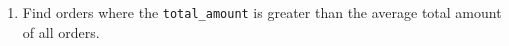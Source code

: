 \documentclass[12pt,a4paper]{article}
\begin{document}
\begin{enumerate}


    \item Find orders where the \texttt{total\_amount} is greater than the average total amount of all orders.







\end{enumerate}
\end{document}
